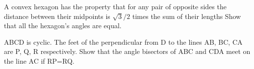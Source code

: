 \item A convex hexagon has the property that for any pair of opposite sides the distance between their midpoints is $\sqrt{3}/2$ times the sum of their lengths Show that all the hexagon’s angles are equal.\\

\item ABCD is cyclic. The feet of the perpendicular from D to the lines AB, BC, CA are P, Q, R respectively. Show that the angle bisectors of ABC and CDA meet on the line AC if RP=RQ.


